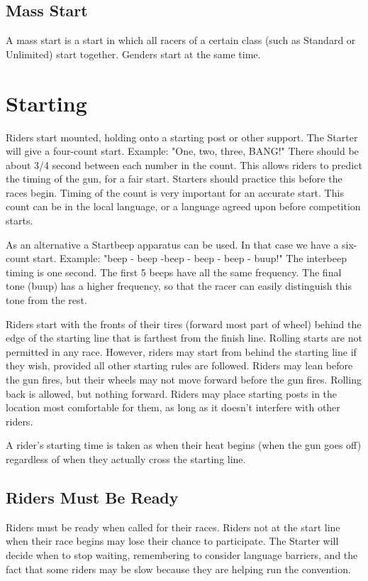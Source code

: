 \subsection{Mass Start}
\label{road:mass_start}
A mass start is a start in which all racers of a certain class (such as Standard or Unlimited) start together. Genders start at the same time.

\section{Starting}
Riders start mounted, holding onto a starting post or other support. The Starter will give a four-count start. Example: "One, two, three, BANG!" There should be about 3/4 second between each number in the count. This allows riders to predict the timing of the gun, for a fair start. Starters should practice this before the races begin. Timing of the count is very important for an accurate start. This count can be in the local language, or a language agreed upon before competition starts.

As an alternative a Startbeep apparatus can be used. In that case we have a six-count start. Example: "beep - beep -beep - beep - beep - buup!" The interbeep timing is one second. The first 5 beeps have all the same frequency. The final tone (buup) has a higher frequency, so that the racer can easily distinguish this tone from the rest.

Riders start with the fronts of their tires (forward most part of wheel) behind the edge of the starting line that is farthest from the finish line. Rolling starts are not permitted in any race. However, riders may start from behind the starting line if they wish, provided all other starting rules are followed. Riders may lean before the gun fires, but their wheels may not move forward before the gun fires. Rolling back is allowed, but nothing forward. Riders may place starting posts in the location most comfortable for them, as long as it doesn't interfere with other riders.

A rider’s starting time is taken as when their heat begins (when the gun goes off) regardless of when they actually cross the starting line.
\subsection{Riders Must Be Ready}
Riders must be ready when called for their races. Riders not at the start line when their race begins may lose their chance to participate. The Starter will decide when to stop waiting, remembering to consider language barriers, and the fact that some riders may be slow because they are helping run the convention.

